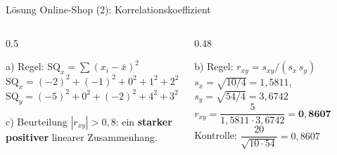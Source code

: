 \documentclass[aspectratio=169,11pt]{beamer}
\newcommand{\mindestzeilenabstand}{%
  \setlength{\lineskiplimit}{2pt}\setlength{\lineskip}{2pt}%
  \setlength{\normallineskiplimit}{2pt}\setlength{\normallineskip}{2pt}}
\newcommand{\SQx}{\text{SQ}_x}
\newcommand{\SQy}{\text{SQ}_y}
\begin{document}
\begin{frame}{Lösung Online-Shop (2): Korrelationskoeffizient}
  \begin{columns}[T]
    \begin{column}{0.5\textwidth}
      \small\mindestzeilenabstand
      \begin{block}{a) Regel: $\SQx = \sum (x_i - \bar{x})^{2}$}
        $\SQx = (-2)^{2} + (-1)^{2} + 0^{2} + 1^{2} + 2^{2} = \mathbf{10}$\\[4pt]
        $\SQy = (-5)^{2} + 0^{2} + (-2)^{2} + 4^{2} + 3^{2} = \mathbf{54}$
      \end{block}
      \begin{exampleblock}{c) Beurteilung}
        $|r_{xy}| > 0{,}8$: ein \textbf{starker positiver} linearer Zusammenhang.
      \end{exampleblock}
    \end{column}
    \begin{column}{0.48\textwidth}
      \small\mindestzeilenabstand
      \begin{block}{b) Regel: $r_{xy} = s_{xy} / (s_x\,s_y)$}
        $s_x = \sqrt{10/4} = 1{,}5811$, \quad $s_y = \sqrt{54/4} = 3{,}6742$\\[3pt]
        $r_{xy} = \dfrac{5}{1{,}5811 \cdot 3{,}6742} = \mathbf{0{,}8607}$\\[3pt]
        Kontrolle: $\dfrac{20}{\sqrt{10 \cdot 54}} = 0{,}8607$ \checkmark
      \end{block}
    \end{column}
  \end{columns}
\end{frame}
\end{document}

